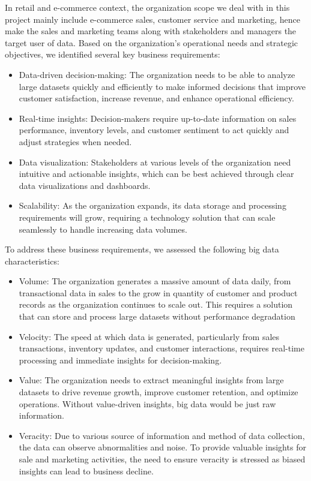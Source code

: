 In retail and e-commerce context, the organization scope we deal with in this project mainly include e-commerce sales, customer service and marketing, hence make the sales and marketing teams along with stakeholders and managers the target user of data. Based on the organization’s operational needs and strategic objectives, we identified several key business requirements:
\begin{itemize}
    \item 
Data-driven decision-making: The organization needs to be able to analyze large datasets quickly and efficiently to make informed decisions that improve customer satisfaction, increase revenue, and enhance operational efficiency.
\item Real-time insights: Decision-makers require up-to-date information on sales performance, inventory levels, and customer sentiment to act quickly and adjust strategies when needed.
\item Data visualization: Stakeholders at various levels of the organization need intuitive and actionable insights, which can be best achieved through clear data visualizations and dashboards.
\item Scalability: As the organization expands, its data storage and processing requirements will grow, requiring a technology solution that can scale seamlessly to handle increasing data volumes.
\end{itemize}
To address these business requirements, we assessed the following big data characteristics:
\begin{itemize}
\item Volume: The organization generates a massive amount of data daily, from transactional data in sales to the grow in quantity of customer and product records as the organization continues to scale out. This requires a solution that can store and process large datasets without performance degradation
\item Velocity: The speed at which data is generated, particularly from sales transactions, inventory updates, and customer interactions, requires real-time processing and immediate insights for decision-making.
\item Value: The organization needs to extract meaningful insights from large datasets to drive revenue growth, improve customer retention, and optimize operations. Without value-driven insights, big data would be just raw information.
\item Veracity: Due to various source of information and method of data collection, the data can observe abnormalities and noise. To provide valuable insights for sale and marketing activities, the need to ensure veracity is stressed as biased insights can lead to business decline.
\end{itemize}
\newpage
